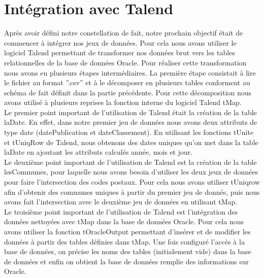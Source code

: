 \documentclass[a4paper,sffamily,12pt]{article}
\begin{document}
		\vspace{0.5cm}
				
	\section{Intégration avec Talend}

		\vspace{0.5cm}
		
		Après avoir défini notre constellation de fait, notre prochain objectif était de commencer à intégrer nos jeux de données. Pour cela nous avons utiliser le logiciel Talend permettant de transformer nos données brut vers les tables relationnelles de la base de données Oracle. Pour réaliser cette transformation nous avons eu plusieurs étapes intermédiaires. La première étape consistait à lire le fichier au format ''.csv'' et à le décomposer en plusieurs tables conforment au schéma de fait définit dans la partie précédente. Pour cette décomposition nous avons utilisé à plusieurs reprises la fonction interne du logiciel Talend tMap. \\
		
    		\indent Le premier point important de l’utilisation de Talend était la création de la table laDate. En effet, dans notre premier jeu de données nous avons deux attributs de type date (datePublication et dateClassement). En utilisant les fonctions tUnite et tUniqRow de Talend, nous obtenons des dates uniques qu’on met dans la table laDate en ajoutant les attributs calculés année, mois et jour. \\
    		
    		\indent Le deuxième point important de l’utilisation de Talend est la création de la table lesCommunes, pour laquelle nous avons besoin d’utiliser les deux jeux de données pour faire l’intersection des codes postaux. Pour cela nous avons utiliser tUniqrow afin d'obtenir des communes uniques à partir du premier jeu de donnés, puis nous avons fait l’intersection avec le deuxième jeu de données en utilisant tMap. \\
    		
    		\indent Le troisième point important de l’utilisation de Talend est l’intégration des données nettoyées avec tMap dans la base de données Oracle. Pour cela nous avons utiliser la fonction tOracleOutput permettant d'insérer et de modifier les données à partir des tables définies dans tMap. Une fois configuré l’accès à la base de données, on précise les noms des tables (initialement vide) dans la base de données et enfin on obtient la base de données remplie des informations sur Oracle. \\		
		
\end{document}
